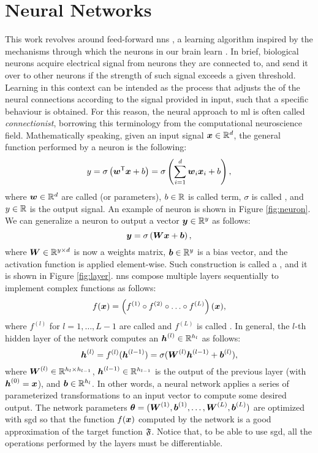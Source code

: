 \section{Neural Networks}\label{sec:nn}
This work revolves around feed-forward \glspl{nn} \citep{haykin2009nnets,goodfellow2016dl}, a learning algorithm inspired by the mechanisms through which the neurons in our brain learn \citep{rosenblatt1958perceptron}. In brief, biological neurons acquire electrical signal from neurons they are connected to, and send it over to other neurons if the strength of such signal exceeds a given threshold. Learning in this context can be intended as the process that adjusts the  of the neural connections according to the signal provided in input, such that a specific behaviour is obtained. For this reason, the neural approach to \gls{ml} is often called \emph{connectionist}, borrowing this terminology from the computational neuroscience field. Mathematically speaking, given an input signal $\Vector{x} \in \Real^d$, the general function performed by a neuron is the following:
$$y = \sigma\Par{\Vector{w}^{\Transpose} \Vector{x} + b} = \sigma\Par{\sum_{i=1}^d \Feature{w}{i} \Feature{x}{i} + b},$$
where $\Vector{w} \in \Real^d$ are called  (or parameters), $b \in \mathbb{R}$ is called  term, $\sigma$ is called , and $y \in \mathbb{R}$ is the output signal. An example of neuron is shown in Figure \ref{fig:neuron}. We can generalize a neuron to output a vector $\Vector{y} \in \Real^y$ as follows:
$$\Vector{y} = \sigma\Par{\Matrix{W} \Vector{x} + \Vector{b}},$$
where $\Matrix{W} \in \Real^{y \times d}$ is now a weights matrix,  $\Vector{b} \in \Real^y$ is a bias vector, and the activation function is applied element-wise. Such construction is called a , and it is shown in Figure \ref{fig:layer}. \glspl{nn} compose multiple layers sequentially to implement complex functions as follows:
$$f(\Vector{x}) = \Par{f^{(1)} \circ f^{(2)} \circ \ldots \circ f^{(L)}}(\Vector{x}),$$
where $f^{(l)}$ for $l = 1, \ldots, L-1$ are called  and $f^{(L)}$ is called . In general, the $l$-th hidden layer of the network computes an  $\LayerVector{h}{l} \in \Real^{h_l}$ as follows:
$$ \LayerVector{h}{l} = f^{(l)}(\LayerVector{h}{l-1}) = \sigma(\LayerMatrix{W}{l} \LayerVector{h}{l-1} + \LayerVector{b}{l}),$$
where $\LayerMatrix{W}{l} \in \Real^{h_{l} \times h_{l-1}}$, $\LayerVector{h}{l-1} \in \Real^{h_{l-1}}$ is the output of the previous layer (with $\LayerVector{h}{0} = \Vector{x}$), and $\Vector{b} \in \Real^{h_l}$. In other words, a neural network applies a series of parameterized transformations to an input vector to compute some desired output. The network parameters $\Param = (\LayerMatrix{W}{1}, \LayerVector{b}{1}, \ldots, \LayerMatrix{W}{L}, \LayerVector{b}{L})$ are optimized with \gls{sgd} so that the  function $f(\Vector{x})$ computed by the network is a good approximation of the target function $\mathfrak{F}$. Notice that, to be able to use \gls{sgd}, all the operations performed by the layers must be differentiable.
